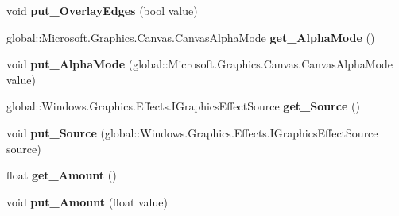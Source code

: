\begin{DoxyCompactItemize}
void {\bfseries put\+\_\+\+Overlay\+Edges} (bool value)
\item 
\mbox{\label{interface_microsoft_1_1_graphics_1_1_canvas_1_1_effects_1_1_i_edge_detection_effect_a54398098083bcd5796ae07a6f2ec7377}} 
global\+::\+Microsoft.\+Graphics.\+Canvas.\+Canvas\+Alpha\+Mode {\bfseries get\+\_\+\+Alpha\+Mode} ()
\item 
\mbox{\label{interface_microsoft_1_1_graphics_1_1_canvas_1_1_effects_1_1_i_edge_detection_effect_af3adb48dad25fee5872063bee9eb520d}} 
void {\bfseries put\+\_\+\+Alpha\+Mode} (global\+::\+Microsoft.\+Graphics.\+Canvas.\+Canvas\+Alpha\+Mode value)
\item 
\mbox{\label{interface_microsoft_1_1_graphics_1_1_canvas_1_1_effects_1_1_i_edge_detection_effect_ae9990d79f4ea9a1bfe5d4eff9af1bb83}} 
global\+::\+Windows.\+Graphics.\+Effects.\+I\+Graphics\+Effect\+Source {\bfseries get\+\_\+\+Source} ()
\item 
\mbox{\label{interface_microsoft_1_1_graphics_1_1_canvas_1_1_effects_1_1_i_edge_detection_effect_ad421800073d091d86a8396aaca06ed81}} 
void {\bfseries put\+\_\+\+Source} (global\+::\+Windows.\+Graphics.\+Effects.\+I\+Graphics\+Effect\+Source source)
\item 
\mbox{\label{interface_microsoft_1_1_graphics_1_1_canvas_1_1_effects_1_1_i_edge_detection_effect_a4e9c33fd362cec60d6638ddd1aeadaab}} 
float {\bfseries get\+\_\+\+Amount} ()
\item 
\mbox{\label{interface_microsoft_1_1_graphics_1_1_canvas_1_1_effects_1_1_i_edge_detection_effect_a25aa355d10926221fb18d7b5ab5d121b}} 
void {\bfseries put\+\_\+\+Amount} (float value)
\item 
\mbox{\label{interface_microsoft_1_1_graphics_1_1_canvas_1_1_effects_1_1_i_edge_detection_effect_a34600b9441ec9b1822069023c004b06d}} 

\end{DoxyCompactItemize}
